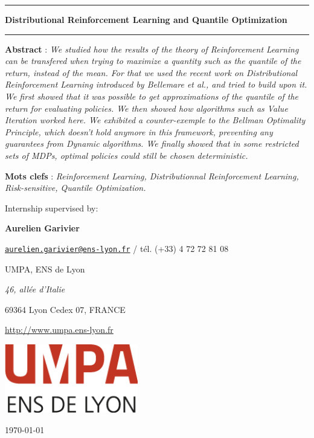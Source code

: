 \begin{center}

\vspace{1.5cm}

\rule[11pt]{5cm}{0.5pt}

\textbf{\huge Distributional Reinforcement Learning and Quantile Optimization}

\rule{5cm}{0.5pt}

\vspace{1.5cm}

\parbox{15cm}{\small
\textbf{Abstract} : \it We studied how the results of the theory of Reinforcement Learning can be transfered when trying to maximize a quantity such as the quantile of the return, instead of the mean. For that we used the recent work on Distributional Reinforcement Learning introduced by Bellemare et al., and tried to build upon it. We first showed that it was possible to get approximations of the quantile of the return for evaluating policies. We then showed how algorithms such as Value Iteration worked here. We exhibited a counter-exemple to the Bellman Optimality Principle, which doesn’t hold anymore in this framework, preventing any guarantees from Dynamic algorithms. We finally showed that in some restricted sets of MDPs, optimal policies could still be chosen deterministic.
} %


\vspace{0.5cm}

\parbox{15cm}{
\textbf{Mots clefs} : \it Reinforcement Learning, Distributionnal Reinforcement Learning, Risk-sensitive, Quantile Optimization.
} %

\vspace{0.5cm}

\parbox{15cm}{
Internship supervised by:

{\bf Aurelien Garivier}

\href{mailto:aurelien.garivier@ens-lyon.fr}{\tt aurelien.garivier@ens-lyon.fr} / tél. (+33) 4 72 72 81 08

UMPA, ENS de Lyon

{\it 46, allée d’Italie

69364 Lyon Cedex 07, FRANCE}

\url{http://www.umpa.ens-lyon.fr}
} %

\vspace{1.5cm}

\includegraphics[height=3cm]{figures/couverture/logo_umpa.jpg}

\end{center}

\vfill
\hfill \today